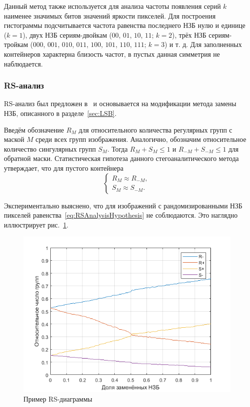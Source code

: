 Данный метод также используется для анализа частоты появления серий $ k $ наименее значимых битов значений яркости пикселей. Для построения гистограммы подсчитывается частота равенства последнего НЗБ нулю и единице ($ k = 1 $), двух НЗБ сериям-двойкам ($ 00 $, $ 01 $, $ 10 $, $ 11 $; $ k = 2 $), трёх НЗБ сериям-тройкам ($ 000 $, $ 001 $, $ 010 $, $ 011 $, $ 100 $, $ 101 $, $ 110 $, $ 111 $; $ k = 3 $) и т. д. Для заполненных контейнеров характерна близость частот, в пустых данная симметрия не наблюдается.

\subsubsection {RS-анализ}

RS-анализ был предложен в~\cite{FridrichRSAnalysis} и основывается на модификации метода замены НЗБ, описанного в разделе~\ref{sec:LSB}.

Введём обозначение $ R_M $ для относительного количества регулярных групп с маской $ M $ среди всех групп изображения. Аналогично, обозначим относительное количество сингулярных групп $ S_M $. Тогда $ R_M + S_M \leq 1$ и $ R_{-M} + S_{-M} \leq 1$ для обратной маски. Статистическая гипотеза данного стегоаналитического метода утверждает, что для пустого контейнера
\begin{equation}
\label{eq:RSAnalysisHypothesis}
\begin{cases}
R_M \approx R_{-M}, \\
S_M \approx S_{-M}.
\end{cases}
\end{equation}

Экспериментально выяснено, что для изображений с рандомизированными НЗБ пикселей равенства~\ref{eq:RSAnalysisHypothesis} не соблюдаются. Это наглядно иллюстрирует рис.~\ref{fig:RSDiagram}.

\begin{figure}[h]
     \centering
     \includegraphics[width=1\textwidth]{include/graphics/rs_diagram}
     \caption{Пример RS-диаграммы}
     \label{fig:RSDiagram}
\end{figure}

